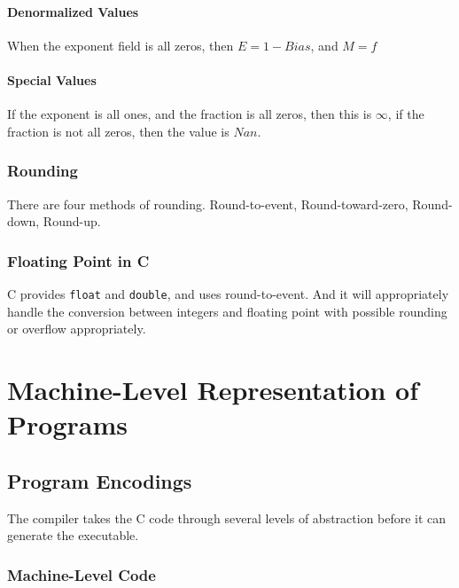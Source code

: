 \documentclass[10pt]{armath}
\newcommand{\s}[1]{\texttt{#1}}
\begin{document}
\paragraph{Denormalized Values}%
\label{par:denormalized_values}

When the exponent field is all zeros, then $E=1-Bias$, and $M=f$

\paragraph{Special Values}%
\label{par:special_values}

If the exponent is all ones, and the fraction is all zeros, then this is
$\infty$, if the fraction is not all zeros, then the value is $Nan$.

\subsubsection{Rounding}%
\label{ssub:rounding}

There are four methods of rounding. Round-to-event, Round-toward-zero,
Round-down, Round-up.

\subsubsection{Floating Point in C}%
\label{ssub:floating_point_in_c}

C provides \s{float} and \s{double}, and uses round-to-event. And it will
appropriately handle the conversion between integers and floating point with
possible rounding or overflow appropriately.

\section{Machine-Level Representation of Programs}%
\label{sec:machine_level_representation_of_programs}

\subsection{Program Encodings}%
\label{sub:program_encodings}

The compiler takes the C code through several levels of abstraction before it
can generate the executable.

\subsubsection{Machine-Level Code}%
\label{ssub:machine_level_code}
\end{document}
